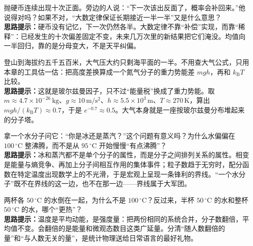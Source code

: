 \begin{puzzles}
\item 抛硬币连续出现十次正面。旁边的人说：“下一次该出反面了，概率会补回来。”他说得对吗？如果不对，“大数定律保证长期接近一半一半”又是什么意思？\\\textbf{思路提示：}硬币没有记忆，下一次仍然各半。大数定律不靠“补偿”实现，而靠“稀释”：已经发生的十次偏差固定不变，未来几万次里的新结果把它们淹没。均值向一半回归，靠的是分母变大，不是天平纠偏。

\item 登山到海拔约五千五百米，大气压大约只剩海平面的一半。不用查大气公式，只用本章的工具估一估：把高度差换算成一个氮气分子的重力势能差 \(mgh\)，再和 \(k_{\mathrm B}T\) 比较。\\\textbf{思路提示：}这就是玻尔兹曼因子，只不过“能量税”换成了重力势能。取 \(m\approx4.7\times10^{-26}\,\mathrm{kg}\)、\(g\approx10\,\mathrm{m/s^2}\)、\(h\approx5.5\times10^3\,\mathrm{m}\)、\(T\approx270\,\mathrm{K}\)，算出 \(mgh/(k_{\mathrm B}T)\approx0.7\)，于是 \(e^{-0.7}\approx0.5\)。大气本身就是一座按玻尔兹曼分布堆起来的分子塔。

\item 拿一个水分子问它：“你是冰还是蒸汽？”这个问题有意义吗？为什么水偏偏在 \(100\,^\circ\mathrm{C}\) 整沸腾，而不是从 \(95\,^\circ\mathrm{C}\) 开始慢慢“有点沸腾”？\\\textbf{思路提示：}冰和蒸汽都不是单个分子的属性，而是分子之间排列关系的属性。相变是能量与熵竞争、再加上分子间相互作用的集体事件；粒子数趋于无穷时，配分函数在特定温度出现数学上的不光滑，于是宏观上呈现一条锋利的界线。“一个水分子”既不在界线的这一边，也不在那一边——界线属于大军团。

\item 两杯各 \(50\,^\circ\mathrm{C}\) 的水倒在一起，为什么不是 \(100\,^\circ\mathrm{C}\)？反过来，半杯 \(50\,^\circ\mathrm{C}\) 的水和整杯 \(50\,^\circ\mathrm{C}\) 的水，哪个“更热”？\\\textbf{思路提示：}温度是平均动能，是强度量：把两份相同的系统合并，分子数翻倍，平均值不变。会翻倍的是能量和微观态数目这类广延量。分清“随人数翻倍的量”和“与人数无关的量”，是统计物理送给日常语言的最好礼物。
\end{puzzles}
